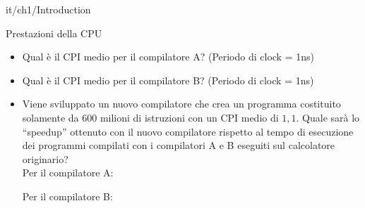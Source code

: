 \documentclass[11pt]{article}
\begin{document}
\begin{quiz}{it/ch1/Introduction}
\begin{cloze}[points=1,shuffle=false]{Prestazioni della CPU}
\begin{itemize}
    \item Qual è il CPI medio per il compilatore A? (Periodo di clock = 1ns)
    \item Qual è il CPI medio per il compilatore B? (Periodo di clock = 1ns) 
    \item Viene sviluppato un nuovo compilatore che crea un programma costituito solamente da 600 milioni di istruzioni con un CPI medio di $1,1$. Quale sarà lo ``speedup'' ottenuto con il nuovo compilatore rispetto al tempo di esecuzione dei programmi compilati con i compilatori A e B eseguiti sul calcolatore originario?\\
    Per il compilatore A: 
    Per il compilatore B: 
\end{itemize}
\end{cloze}


\end{quiz}
\end{document}
